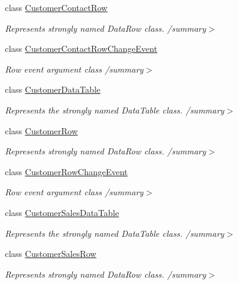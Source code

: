 \begin{DoxyCompactItemize}
class \hyperlink{class_products_1_1_data_1_1ds_sage_1_1_customer_contact_row}{Customer\+Contact\+Row}
\begin{DoxyCompactList}\small\item\em Represents strongly named Data\+Row class. /summary$>$ \end{DoxyCompactList}\item 
class \hyperlink{class_products_1_1_data_1_1ds_sage_1_1_customer_contact_row_change_event}{Customer\+Contact\+Row\+Change\+Event}
\begin{DoxyCompactList}\small\item\em Row event argument class /summary$>$ \end{DoxyCompactList}\item 
class \hyperlink{class_products_1_1_data_1_1ds_sage_1_1_customer_data_table}{Customer\+Data\+Table}
\begin{DoxyCompactList}\small\item\em Represents the strongly named Data\+Table class. /summary$>$ \end{DoxyCompactList}\item 
class \hyperlink{class_products_1_1_data_1_1ds_sage_1_1_customer_row}{Customer\+Row}
\begin{DoxyCompactList}\small\item\em Represents strongly named Data\+Row class. /summary$>$ \end{DoxyCompactList}\item 
class \hyperlink{class_products_1_1_data_1_1ds_sage_1_1_customer_row_change_event}{Customer\+Row\+Change\+Event}
\begin{DoxyCompactList}\small\item\em Row event argument class /summary$>$ \end{DoxyCompactList}\item 
class \hyperlink{class_products_1_1_data_1_1ds_sage_1_1_customer_sales_data_table}{Customer\+Sales\+Data\+Table}
\begin{DoxyCompactList}\small\item\em Represents the strongly named Data\+Table class. /summary$>$ \end{DoxyCompactList}\item 
class \hyperlink{class_products_1_1_data_1_1ds_sage_1_1_customer_sales_row}{Customer\+Sales\+Row}
\begin{DoxyCompactList}\small\item\em Represents strongly named Data\+Row class. /summary$>$ \end{DoxyCompactList}\item 

\end{DoxyCompactItemize}
